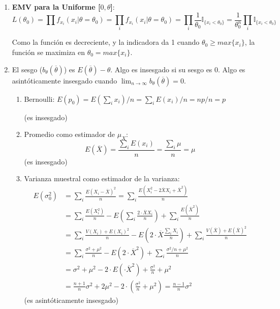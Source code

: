 \begin{enumerate}
	\item
		\textbf{EMV para la Uniforme [$0,\theta$]}:
		$$L(\theta_0) = \prod f_{x_i}(x_i|\theta = \theta_0)
			= \prod_i f_{x_i}(x_i|\theta = \theta_0)
			= \prod_i \frac{1}{\theta_0} \mathbb{I}_{\{x_i < \theta_0\}}
			= \frac{1}{\theta_0^n} \prod_i \mathbb{I}_{\{x_i < \theta_0\}}$$
			
		Como la función es decreciente, y la indicadora da 1 cuando $\theta_0 \geq max\{x_i\}$, la función se maximiza en $\theta_0 =  max\{x_i\}$.
		
	\item
		El sesgo ($b_{\theta}(\overline{\theta})$) es $E(\overline{\theta}) - \theta$.
		Algo es insesgado si su sesgo es 0. Algo es asintóticamente insesgado cuando $\lim_{n\rightarrow\infty}b_{\theta}(\overline{\theta}) = 0$.
		
		\begin{enumerate}
			\item Bernoulli: $E(p_0) = E(\sum_i x_i) / n = \sum_i E(x_i) / n = np/n = p$
			
			(es insesgado)
			\item Promedio como estimador de $\mu_X$:
				$$E(\overline{X}) = \frac{\sum_i E(x_i)}{n} = \frac{\sum_i \mu}{n} = \mu$$ (es insesgado)
			\item Varianza muestral como estimador de la varianza:
				\begin{align*}
					E(\sigma_0^2) 	& = \sum_i \frac{E(X_i - \overline{X})^2}{n} = \sum_i \frac{E(X_i^2 -2\overline{X}X_i + \overline{X}^2)}{n}												\\
									& = \sum_i \frac{E(X_i^2)}{n} - E\left(\sum_i\frac{2\cdot \overline{X}X_i}{n}\right) + \sum_i\frac{E(\overline{X}^2)}{n}								\\
									& = \sum_i \frac{V(X_i) + E(X_i)^2}{n} - E\left(2\cdot \overline{X}\frac{\sum_i X_i}{n}\right) + \sum_i\frac{V(\overline{X}) + E(\overline{X})^2}{n}	\\
									& = \sum_i \frac{\sigma^2 + \mu^2}{n} - E(2\cdot \overline{X}^2) + \sum_i\frac{\sigma^2/n + \mu^2}{n}													\\
									& = \sigma^2 + \mu^2 - 2\cdot E(\cdot \overline{X}^2) + \frac{\sigma^2}{n} + \mu^2																		\\
									& = \frac{n+1}{n}\sigma^2 + 2\mu^2 - 2\cdot \left(\frac{\sigma^2}{n} + \mu^2\right) = \frac{n-1}{n}\sigma^2
				\end{align*}
				(es asintóticamente insesgado)
		\end{enumerate}
		
	
\end{enumerate}
